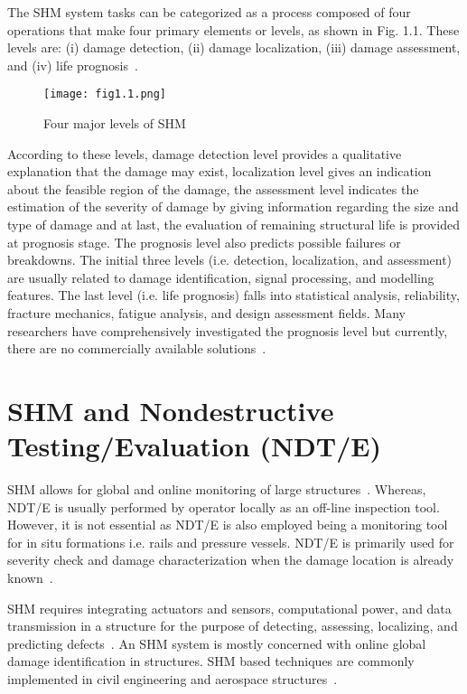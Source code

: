 \documentclass[b5paper, 11pt, titlepage]{book}
\begin{document}
The SHM system tasks can be categorized as a process composed of four operations that make four primary elements or levels, as shown in Fig. 1.1. These levels are: (i) damage detection, (ii) damage localization, (iii) damage assessment, and (iv) life prognosis~\cite{stepinski2013advanced,TibaduizaBurgos2020}. 
\begin{figure} [h!]
	\begin{center}
		\centering
		\texttt{[image: fig1.1.png]}
	\end{center}
	\caption{Four major levels of SHM} 
	\label{fig:fig1.1}
\end{figure}

According to these levels, damage detection level provides a qualitative explanation that the damage may exist, localization level gives an indication about the feasible region of the damage, the assessment level indicates the estimation of the severity of damage by giving information regarding the size and type of damage and at last, the evaluation of remaining structural life is provided at prognosis stage. The prognosis level also predicts possible failures or breakdowns. The initial three levels (i.e. detection, localization, and assessment) are usually related to damage identification, signal processing, and modelling features. The last level (i.e. life prognosis) falls into statistical analysis, reliability, fracture mechanics, fatigue analysis, and design assessment fields. Many researchers have comprehensively investigated the prognosis level but currently, there are no commercially available solutions~\cite{stepinski2013advanced, TibaduizaBurgos2020}. 

\section{SHM and Nondestructive Testing/Evaluation (NDT/E)}
SHM allows for global and online monitoring of large structures~\cite{stepinski2013advanced}. Whereas, NDT/E is usually performed by operator locally as an off-line inspection tool. However, it is not essential as NDT/E is also employed being a monitoring tool for in situ formations i.e. rails and pressure vessels. NDT/E is primarily used for severity check and damage characterization when the damage location is already known~\cite{Farrar2007,Farrar2012}.

SHM requires integrating actuators and sensors, computational power, and data transmission in a structure for the purpose of detecting, assessing, localizing, and predicting defects~\cite{stepinski2013advanced, jawaid2018structural}. An SHM system is mostly concerned with online global damage identification in structures. SHM based techniques are commonly implemented in civil engineering and aerospace structures~\cite{stepinski2013advanced, jawaid2018structural}. 
\end{document}
